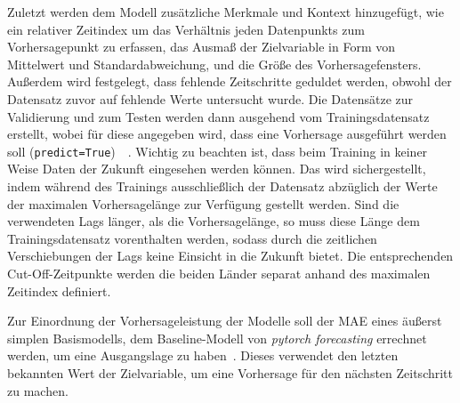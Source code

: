 Zuletzt werden dem Modell zusätzliche Merkmale und Kontext hinzugefügt, wie ein relativer Zeitindex um das Verhältnis jeden Datenpunkts zum Vorhersagepunkt zu erfassen, das Ausmaß der Zielvariable in Form von Mittelwert und Standardabweichung, und die Größe des Vorhersagefensters.
Außerdem wird festgelegt, dass fehlende Zeitschritte geduldet werden, obwohl der Datensatz zuvor auf fehlende Werte untersucht wurde.
Die Datensätze zur Validierung und zum Testen werden dann ausgehend vom Trainingsdatensatz erstellt, wobei für diese angegeben wird, dass eine Vorhersage ausgeführt werden soll (\lstinline[columns=fixed]{predict=True})~\cite{Labiadh.2023}~\cite{GitHub.20240307T20:56:16.000Z}.
Wichtig zu beachten ist, dass beim Training in keiner Weise Daten der Zukunft eingesehen werden können.
Das wird sichergestellt, indem während des Trainings ausschließlich der Datensatz abzüglich der Werte der maximalen Vorhersagelänge zur Verfügung gestellt werden.
Sind die verwendeten Lags länger, als die Vorhersagelänge, so muss diese Länge dem Trainingsdatensatz vorenthalten werden, sodass durch die zeitlichen Verschiebungen der Lags keine Einsicht in die Zukunft bietet.
Die entsprechenden Cut-Off-Zeitpunkte werden die beiden Länder separat anhand des maximalen Zeitindex definiert.

Zur Einordnung der Vorhersageleistung der Modelle soll der \ac{MAE} eines äußerst simplen Basismodells, dem Baseline-Modell von \textit{pytorch forecasting} errechnet werden, um eine Ausgangslage zu haben~\cite{PytorchForecastingDocumentation.20230410T20:05:46.000Zb}.
Dieses verwendet den letzten bekannten Wert der Zielvariable, um eine Vorhersage für den nächsten Zeitschritt zu machen.

